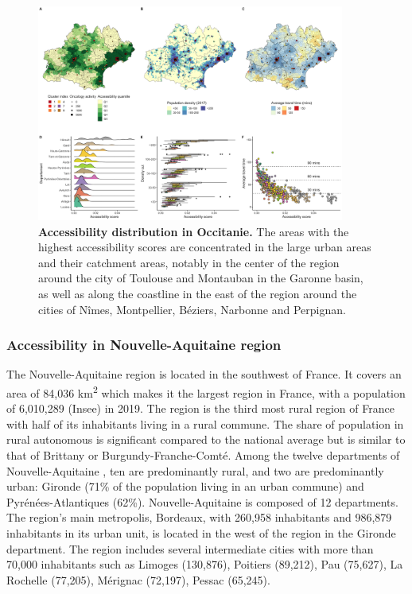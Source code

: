 \begin{figure}[h!]
    \includegraphics[width=0.9\textwidth]{images/camion/region_accessibility/accessibility_Occitanie.png}
    \centering
    \caption{
        \textbf{Accessibility distribution in Occitanie.} The areas with the highest accessibility scores are concentrated in
        the large urban areas and their catchment areas, notably in the center of the
        region around the city of Toulouse and Montauban in the Garonne basin, as well
        as along the coastline in the east of the region around the cities of Nîmes,
        Montpellier, Béziers, Narbonne and Perpignan.
    }
\end{figure}

\subsubsection{Accessibility in Nouvelle-Aquitaine region}

The Nouvelle-Aquitaine region is located in the southwest of France. It covers
an area of 84,036 km\textsuperscript{2} which makes it the largest region in
France, with a population of 6,010,289 (Insee) in 2019. The region is the third
most rural region of France with half of its inhabitants living in a rural
commune. The share of population in rural autonomous is significant compared to
the national average but is similar to that of Brittany or
Burgundy-Franche-Comté. Among the twelve departments of Nouvelle-Aquitaine , ten
are predominantly rural, and two are predominantly urban: Gironde (71\% of the
population living in an urban commune) and Pyrénées-Atlantiques (62\%).
Nouvelle-Aquitaine is composed of 12 departments. The region's main metropolis,
Bordeaux, with 260,958 inhabitants and 986,879 inhabitants in its urban unit, is
located in the west of the region in the Gironde department. The region includes
several intermediate cities with more than 70,000 inhabitants such as Limoges
(130,876), Poitiers (89,212), Pau (75,627), La Rochelle (77,205), Mérignac
(72,197), Pessac (65,245).

